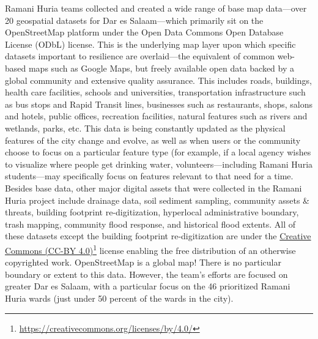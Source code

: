 \documentclass[a4paper,12pt,twoside]{article}
\begin{document}
\begin{multicols}{2}
Ramani Huria teams collected and created a wide range of base map data—over 20 geospatial datasets for Dar es Salaam—which primarily sit on the OpenStreetMap platform under the Open Data Commons Open Database License (ODbL) license. This is the underlying map layer upon which specific datasets important to resilience are overlaid—the equivalent of common web-based maps such as Google Maps, but freely available open data backed by a global community and extensive quality assurance.
This includes roads, buildings, health care facilities, schools and universities, transportation infrastructure such as bus stops and Rapid Transit lines, businesses such as restaurants, shops, salons and hotels, public offices, recreation facilities, natural features such as rivers and wetlands, parks, etc. This data is being constantly updated as the physical features of the city change and evolve, as well as when users or the community choose to focus on a particular feature type (for example, if a local agency wishes to visualize where people get drinking water, volunteers—including Ramani Huria students—may specifically focus on features relevant to that need for a time.
Besides base data, other major digital assets that were collected in the Ramani Huria project include drainage data, soil sediment sampling, community assets & threats, building footprint re-digitization, hyperlocal administrative boundary, trash mapping, community flood response, and historical flood extents. All of these datasets except the building footprint re-digitization are under the \href{https://creativecommons.org/licenses/by/4.0/}{Creative Commons (CC-BY 4.0)}\footnote{\url{https://creativecommons.org/licenses/by/4.0/}} license enabling the free distribution of an otherwise copyrighted work.
OpenStreetMap is a global map! There is no particular boundary or extent to this data. However, the team’s efforts are focused on greater Dar es Salaam, with a particular focus on the 46 prioritized Ramani Huria wards (just under 50 percent of the wards in the city).
\end{multicols}
\end{document}
